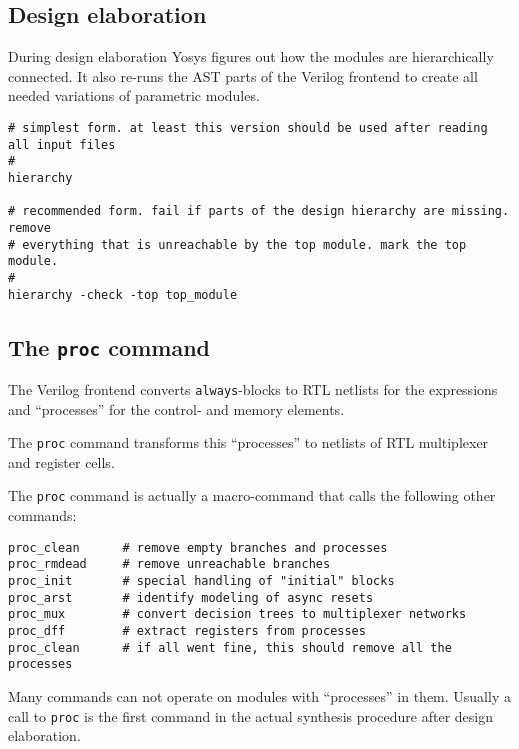 
\subsection{Design elaboration}

\begin{frame}[fragile]{\subsecname}
During design elaboration Yosys figures out how the modules are hierarchically
connected. It also re-runs the AST parts of the Verilog frontend to create
all needed variations of parametric modules.

\bigskip
\begin{lstlisting}[xleftmargin=0.5cm, basicstyle=\ttfamily\fontsize{8pt}{10pt}\selectfont, language=ys]
# simplest form. at least this version should be used after reading all input files
#
hierarchy

# recommended form. fail if parts of the design hierarchy are missing. remove
# everything that is unreachable by the top module. mark the top module.
#
hierarchy -check -top top_module
\end{lstlisting}
\end{frame}


\subsection{The {\tt proc} command}

\begin{frame}[fragile]{\subsecname}
The Verilog frontend converts {\tt always}-blocks to RTL netlists for the
expressions and ``processes'' for the control- and memory elements.

\medskip
The {\tt proc} command transforms this ``processes'' to netlists of RTL
multiplexer and register cells.

\medskip
The {\tt proc} command is actually a macro-command that calls the following
other commands:

\begin{lstlisting}[xleftmargin=0.5cm, basicstyle=\ttfamily\fontsize{8pt}{10pt}\selectfont, language=ys]
proc_clean      # remove empty branches and processes
proc_rmdead     # remove unreachable branches
proc_init       # special handling of "initial" blocks
proc_arst       # identify modeling of async resets
proc_mux        # convert decision trees to multiplexer networks
proc_dff        # extract registers from processes
proc_clean      # if all went fine, this should remove all the processes
\end{lstlisting}

\medskip
Many commands can not operate on modules with ``processes'' in them. Usually
a call to {\tt proc} is the first command in the actual synthesis procedure
after design elaboration.
\end{frame}

